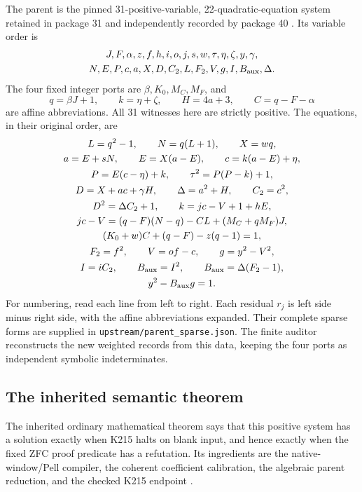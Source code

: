 \documentclass[11pt,letterpaper]{article}
\theoremstyle{definition}\newtheorem{definition}[theorem]{Definition}
\newcommand{\file}[1]{{\small\nolinkurl{#1}}}
\begin{document}
The parent is the pinned 31-positive-variable, 22-quadratic-equation system
retained in package 31 and independently recorded by package 40
\cite{parent,package31,package40}. Its variable order is
\begin{gather*}
J,F,\alpha,z,f,h,i,o,j,s,w,\tau,\eta,\zeta,y,\gamma,\\
N,E,P,c,a,X,D,C_2,L,F_2,V,g,I,B_{\rm aux},\Delta.
\end{gather*}
The four fixed integer ports are $\beta,K_0,M_C,M_F$, and
\[
q=\beta J+1,\qquad k=\eta+\zeta,\qquad H=4a+3,\qquad C=q-F-\alpha
\]
are affine abbreviations. All 31 witnesses here are strictly positive.
The equations, in their original order, are
\begin{gather}
L=q^2-1,\qquad N=q(L+1),\qquad X=wq,\notag\\
a=E+sN,\qquad E=X(a-E),\qquad c=k(a-E)+\eta,\notag\\
P=E(c-\eta)+k,\qquad \tau^2=P(P-k)+1,\notag\\
D=X+ac+\gamma H,\qquad \Delta=a^2+H,\qquad C_2=c^2,\notag\\
D^2=\Delta C_2+1,\qquad k=jc-V+1+hE,\notag\\
jc-V=(q-F)(N-q)-CL+(M_C+qM_F)J,\notag\\
(K_0+w)C+(q-F)-z(q-1)=1,\notag\\
F_2=f^2,\qquad V=of-c,\qquad g=y^2-V^2,\notag\\
I=iC_2,\qquad B_{\rm aux}=I^2,\qquad B_{\rm aux}=\Delta(F_2-1),\notag\\
y^2-B_{\rm aux}g=1.\label{eq:parent}
\end{gather}
For numbering, read each line from left to right. Each residual $r_j$ is
left side minus right side, with the affine abbreviations expanded. Their
complete sparse forms are supplied in \file{upstream/parent_sparse.json}.
The finite auditor reconstructs the new weighted records from this data,
keeping the four ports as independent symbolic indeterminates.

\subsection{The inherited semantic theorem}
The inherited ordinary mathematical theorem says that this positive system
has a solution exactly when K215 halts on blank input, and hence exactly
when the fixed ZFC proof predicate has a refutation. Its ingredients are
the native-window/Pell compiler, the coherent coefficient calibration,
the algebraic parent reduction, and the checked K215 endpoint
\cite{parent,package31,k215,native}.
\end{document}
